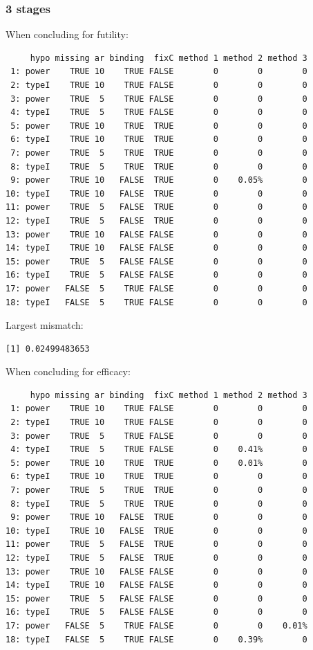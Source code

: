 \documentclass[12pt]{article}
\begin{document}
\clearpage

\subsubsection{3 stages}
\label{sec:orgaf105ea}

When concluding for futility:
\begin{verbatim}
     hypo missing ar binding  fixC method 1 method 2 method 3
 1: power    TRUE 10    TRUE FALSE        0        0        0
 2: typeI    TRUE 10    TRUE FALSE        0        0        0
 3: power    TRUE  5    TRUE FALSE        0        0        0
 4: typeI    TRUE  5    TRUE FALSE        0        0        0
 5: power    TRUE 10    TRUE  TRUE        0        0        0
 6: typeI    TRUE 10    TRUE  TRUE        0        0        0
 7: power    TRUE  5    TRUE  TRUE        0        0        0
 8: typeI    TRUE  5    TRUE  TRUE        0        0        0
 9: power    TRUE 10   FALSE  TRUE        0    0.05%        0
10: typeI    TRUE 10   FALSE  TRUE        0        0        0
11: power    TRUE  5   FALSE  TRUE        0        0        0
12: typeI    TRUE  5   FALSE  TRUE        0        0        0
13: power    TRUE 10   FALSE FALSE        0        0        0
14: typeI    TRUE 10   FALSE FALSE        0        0        0
15: power    TRUE  5   FALSE FALSE        0        0        0
16: typeI    TRUE  5   FALSE FALSE        0        0        0
17: power   FALSE  5    TRUE FALSE        0        0        0
18: typeI   FALSE  5    TRUE FALSE        0        0        0
\end{verbatim}

Largest mismatch:
\begin{verbatim}
[1] 0.02499483653
\end{verbatim}



When concluding for efficacy:
\begin{verbatim}
     hypo missing ar binding  fixC method 1 method 2 method 3
 1: power    TRUE 10    TRUE FALSE        0        0        0
 2: typeI    TRUE 10    TRUE FALSE        0        0        0
 3: power    TRUE  5    TRUE FALSE        0        0        0
 4: typeI    TRUE  5    TRUE FALSE        0    0.41%        0
 5: power    TRUE 10    TRUE  TRUE        0    0.01%        0
 6: typeI    TRUE 10    TRUE  TRUE        0        0        0
 7: power    TRUE  5    TRUE  TRUE        0        0        0
 8: typeI    TRUE  5    TRUE  TRUE        0        0        0
 9: power    TRUE 10   FALSE  TRUE        0        0        0
10: typeI    TRUE 10   FALSE  TRUE        0        0        0
11: power    TRUE  5   FALSE  TRUE        0        0        0
12: typeI    TRUE  5   FALSE  TRUE        0        0        0
13: power    TRUE 10   FALSE FALSE        0        0        0
14: typeI    TRUE 10   FALSE FALSE        0        0        0
15: power    TRUE  5   FALSE FALSE        0        0        0
16: typeI    TRUE  5   FALSE FALSE        0        0        0
17: power   FALSE  5    TRUE FALSE        0        0    0.01%
18: typeI   FALSE  5    TRUE FALSE        0    0.39%        0
\end{verbatim}
\end{document}
